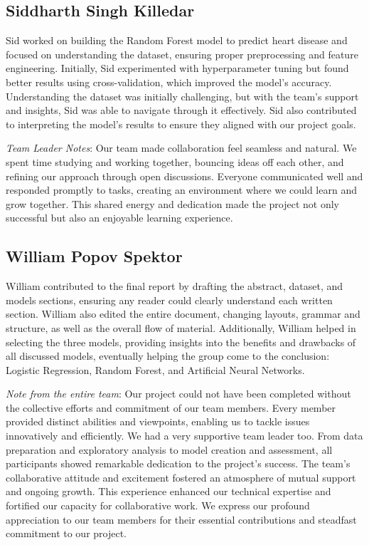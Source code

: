 \subsection{Siddharth Singh Killedar}
Sid worked on building the Random Forest model to predict heart disease and focused on understanding the dataset, ensuring proper preprocessing and feature engineering. Initially, Sid experimented with hyperparameter tuning but found better results using cross-validation, which improved the model's accuracy. Understanding the dataset was initially challenging, but with the team's support and insights, Sid was able to navigate through it effectively. Sid also contributed to interpreting the model's results to ensure they aligned with our project goals.

\textit{Team Leader Notes}: Our team made collaboration feel seamless and natural. We spent time studying and working together, bouncing ideas off each other, and refining our approach through open discussions. Everyone communicated well and responded promptly to tasks, creating an environment where we could learn and grow together. This shared energy and dedication made the project not only successful but also an enjoyable learning experience.

\subsection{William Popov Spektor}
William contributed to the final report by drafting the abstract, dataset, and models sections, ensuring any reader could clearly understand each written section. William also edited the entire document, changing layouts, grammar and structure, as well as the overall flow of material. Additionally, William helped in selecting the three models, providing insights into the benefits and drawbacks of all discussed models, eventually helping the group come to the conclusion: Logistic Regression, Random Forest, and Artificial Neural Networks.


\textit{Note from the entire team}: Our project could not have been completed without the collective efforts and commitment of our team members. Every member provided distinct abilities and viewpoints, enabling us to tackle issues innovatively and efficiently. We had a very supportive team leader too. From data preparation and exploratory analysis to model creation and assessment, all participants showed remarkable dedication to the project's success.
The team's collaborative attitude and excitement fostered an atmosphere of mutual support and ongoing growth. This experience enhanced our technical expertise and fortified our capacity for collaborative work. We express our profound appreciation to our team members for their essential contributions and steadfast commitment to our project.
